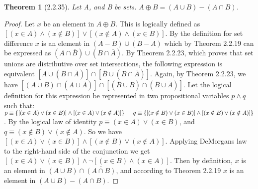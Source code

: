 \documentclass[a4paper, 12pt]{article}
\theoremstyle{plain}
\newtheorem*{theorem*}{Theorem}
\begin{document}
	
	\begin{theorem*}[2.2.35]
		Let A, and B be sets. $A \oplus B = (A \cup B) - (A \cap B)$.
	\end{theorem*}
	
	\begin{proof}
		Let $x$ be an element in $A \oplus B$. This is logically defined as \newline 
		$[(x \in A) \land (x \notin B)] \lor [(x \notin A) \land (x \in B)]$. By the definition 
		for set difference $x$ is an element in $(A - B) \cup (B - A)$ which by Theorem 2.2.19 
		can be expressed as 
		$(A \cap \overline{B}) \cup (B \cap \overline{A})$. By Theorem 2.2.23, which proves that 
		set unions are distributive over set intersections, the following expression is equivalent 
		$[A \cup (B \cap \overline{A})] \cap [\overline{B} \cup (B \cap \overline{A})]$. Again, 
		by Theorem 2.2.23, we have 
		$[(A \cup B) \cap (A \cup \overline{A})] \cap [(\overline{B} \cup B) \cap (\overline{B} 
			\cup \overline{A})]$. 
		Let the logical definition for this expression be represented in two propositional variables 
		$p \land q$ such that: \newline \indent 
		$p \equiv \{[(x \in A) \lor (x \in B)] \land [(x \in A) \lor (x \notin A)]\} 
		\newline \indent q \equiv \{[(x \notin B) \lor (x \in B)] \land 
		[(x \notin B) \lor (x \notin A)]\}$. 
		\newline By the logical law of identity $p \equiv (x \in A) \lor (x \in B)$, and 
		\newline $q \equiv (x \notin B) \lor (x \notin A)$. So we have 
		$[(x \in A) \lor (x \in B)] \land [(x \notin B) \lor (x \notin A)]$. Applying DeMorgans law 
		to the right-hand side of the conjunction we get \newline 
		$[(x \in A) \lor (x \in B)] \land \lnot [(x \in B) \land (x \in A)]$. Then by definition, 
		$x$ is an element in $(A \cup B) \cap \overline{(A \cap B)}$, and according to Theorem 
		2.2.19 $x$ is an element in $(A \cup B) - (A \cap B)$.
		

\end{proof}
\end{document}

